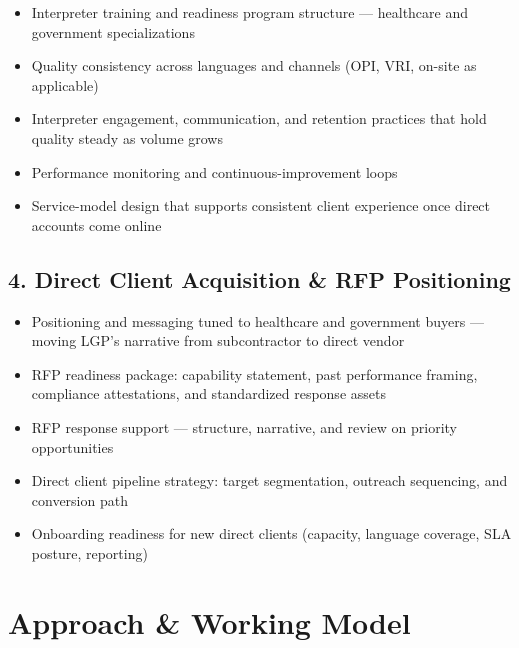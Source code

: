 \documentclass{proposal}
\begin{document}
\begin{itemize}[leftmargin=1.5em, itemsep=3pt, topsep=2pt]
  \item Interpreter training and readiness program structure ---
        healthcare and government specializations
  \item Quality consistency across languages and channels (OPI, VRI,
        on-site as applicable)
  \item Interpreter engagement, communication, and retention practices
        that hold quality steady as volume grows
  \item Performance monitoring and continuous-improvement loops
  \item Service-model design that supports consistent client experience
        once direct accounts come online
\end{itemize}

\subsection{4. Direct Client Acquisition \& RFP Positioning}

\begin{itemize}[leftmargin=1.5em, itemsep=3pt, topsep=2pt]
  \item Positioning and messaging tuned to healthcare and government
        buyers --- moving LGP's narrative from subcontractor to direct
        vendor
  \item RFP readiness package: capability statement, past performance
        framing, compliance attestations, and standardized response assets
  \item RFP response support --- structure, narrative, and review on
        priority opportunities
  \item Direct client pipeline strategy: target segmentation, outreach
        sequencing, and conversion path
  \item Onboarding readiness for new direct clients (capacity, language
        coverage, SLA posture, reporting)
\end{itemize}

\section{Approach \& Working Model}
\end{document}

